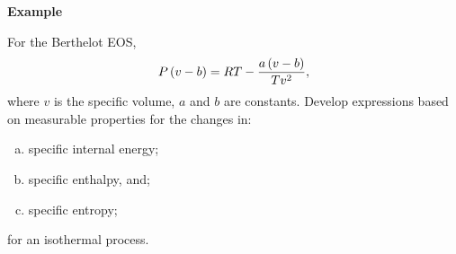    \begin{MyExample}{\begin{center}{\bf Example}\end{center}}
     \begin{example}\label{Chapter:ThermodynamicPropertiesPureFluids:Example4} \citep{Balmer_Book}
         For the Berthelot EOS,
           \begin{displaymath}
              P\left(v-b\right) = RT - \displaystyle\frac{a\left(v-b\right)}{Tv^{2}},
           \end{displaymath}
         where $v$ is the specific volume, $a$ and $b$ are constants. Develop expressions based on measurable properties for the changes in:
         \begin{enumerate}[a)]
            \item specific internal energy;
            \item specific enthalpy, and;
            \item specific entropy;
         \end{enumerate}
          for an isothermal process.
     \end{example}


\end{MyExample}
